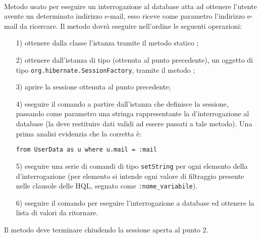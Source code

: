 \begin{description}
	\item{}\\
	Metodo usato per eseguire un interrogazione al database atta ad ottenere l'utente avente un determinato indirizzo e-mail, esso riceve come parametro l'indirizzo e-mail da ricercare. Il metodo dovrà eseguire nell'ordine le seguenti operazioni:
		\begin{itemize}
			\item[1)] ottenere dalla classe  l'istanza tramite il metodo statico ;
			\item[2)] ottenere dall'istanza di tipo (ottenuta al punto precedente), un oggetto di tipo \texttt{org.hibernate.SessionFactory}, tramite il metodo ;
			\item[3)] aprire la sessione ottenuta al punto precedente;
			\item[4)] eseguire il comando  a partire dall'istanza che definisce la sessione, passando come parametro una stringa rappresentante la  d'interrogazione al database (la  deve restituire dati validi ad essere passati a tale metodo). Una prima analisi evidenzia che la  corretta è: 
\begin{verbatim}
from UserData as u where u.mail = :mail
\end{verbatim}
			\item[5)] eseguire una serie di comandi di tipo \texttt{setString} per ogni elemento della  d'interrogazione (per elemento si intende ogni valore di filtraggio presente nelle clausole  delle  HQL, segnato come \texttt{:nome\_variabile}).
			\item[6)] eseguire il comando  per eseguire l'interrogazione a database ed ottenere la lista di valori da ritornare.
		\end{itemize}
		
Il metodo deve terminare chiudendo la sessione aperta al punto 2.	
	

\end{description}
